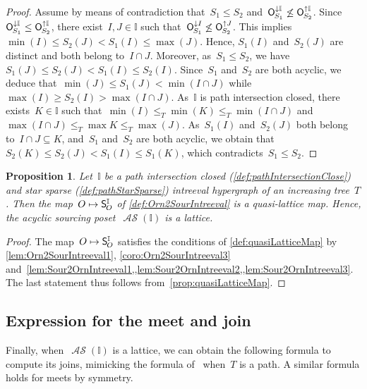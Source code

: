 \documentclass{amsart}
\newtheorem{proposition}[theorem]{Proposition}
\theoremstyle{definition}
\newcommand{\mymap}[2]{\mathsf{#1}_{\hspace{-.7pt}#2}}
\newcommand{\minorn}[2]{\mymap{O}{#1}^{\downarrow#2}}  %
\newcommand{\maxorn}[2]{\mymap{O}{#1}^{\uparrow#2}}  %
\newcommand{\sour}[1]{\mymap{S}{#1}}  %
\DeclareMathOperator{\ASour}{\mathcal{AS}}  %
\newcommand{\II}{\mathbb I} %
\begin{document}
\begin{proof}
Assume by means of contradiction that~$S_1 \le S_2$ and~$\minorn{S_1}{\II} \not\le \maxorn{S_2}{\II}$.
Since~$\minorn{S_1}{\II} \le \maxorn{S_2}{\II}$, there exist~$I, J \in \II$ such that~$\minorn{S_1}{I} \not\le \maxorn{S_2}{J}$.
This implies~$\min(I) \le S_2(J) < S_1(I) \le \max(J)$.
Hence, $S_1(I)$ and~$S_2(J)$ are distinct and both belong to~$I \cap J$.
Moreover, as~$S_1 \le S_2$, we have~$S_1(J) \le S_2(J) < S_1(I) \le S_2(I)$.
Since~$S_1$ and~$S_2$ are both acyclic, we deduce that~$\min(J) \le S_1(J) < \min(I \cap J)$ while~$\max(I) \ge S_2(I) > \max(I \cap J)$.
As~$\II$ is path intersection closed, there exists~$K \in \II$ such that~$\min(I) \le_T \min(K) \le_T \min(I\cap J)$ and $\max(I\cap J) \le_T \max K \le_T \max(J)$.
As~$S_1(I)$ and~$S_2(J)$ both belong to~$I \cap J \subseteq K$, and~$S_1$ and~$S_2$ are both acyclic, we obtain that~$S_2(K) \le S_2(J) < S_1(I) \le S_1(K)$, which contradicts~$S_1 \le S_2$.
\end{proof}

\begin{proposition}
\label{prop:quasiLatticeMapIntreevalLattices}
Let~$\II$ be a path intersection closed (\cref{def:pathIntersectionClose}) and star sparse (\cref{def:pathStarSparse}) intreeval hypergraph of an increasing tree~$T$.
Then the map~$O \mapsto \sour{O}^\II$ of \cref{def:Orn2SourIntreeval} is a quasi-lattice map.
Hence, the acyclic sourcing poset~$\ASour(\II)$ is a lattice.
\end{proposition}

\begin{proof}
The map~$O \mapsto \sour{O}^\II$ satisfies the conditions of \cref{def:quasiLatticeMap} by \cref{lem:Orn2SourIntreeval1}, \cref{coro:Orn2SourIntreeval3} and~\cref{lem:Sour2OrnIntreeval1,,lem:Sour2OrnIntreeval2,,lem:Sour2OrnIntreeval3}.
The last statement thus follows from~\cref{prop:quasiLatticeMap}.
\end{proof}


\subsection{Expression for the meet and join}
\label{subsec:formulaMeetJoin}

Finally, when~$\ASour(\II)$ is a lattice, we can obtain the following formula to compute its joins, mimicking the formula of~\cite[Prop.~4.15]{BergeronPilaud} when~$T$ is a path.
A similar formula holds for meets by symmetry.
\end{document}
